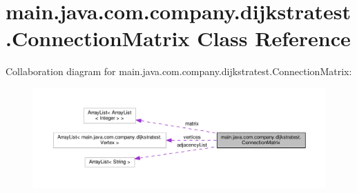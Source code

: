 \hypertarget{classmain_1_1java_1_1com_1_1company_1_1dijkstratest_1_1_connection_matrix}{\section{main.\-java.\-com.\-company.\-dijkstratest.\-Connection\-Matrix Class Reference}
\label{classmain_1_1java_1_1com_1_1company_1_1dijkstratest_1_1_connection_matrix}
}


Collaboration diagram for main.\-java.\-com.\-company.\-dijkstratest.\-Connection\-Matrix\-:
\nopagebreak
\begin{figure}[H]
\begin{center}
\leavevmode
\includegraphics[width=350pt]{classmain_1_1java_1_1com_1_1company_1_1dijkstratest_1_1_connection_matrix__coll__graph}
\end{center}
\end{figure}
